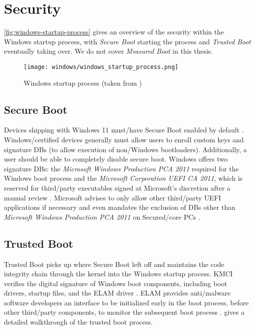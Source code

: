 
\section{Security}
\vspace{-0.5em}

\autoref{fig:windows-startup-process} gives an overview of the security within the Windows startup process, with \emph{Secure Boot} starting the process and \emph{Trusted Boot} eventually taking over.
We do not cover \emph{Measured Boot} in this thesis.

\begin{figure}[phtb]
    \centering
    \texttt{[image: windows/windows\_startup\_process.png]}
    \caption[Windows startup process]{Windows startup process (taken from \cite{microsoft-secure-the-windows-boot-process})}
    \label{fig:windows-startup-process}
\end{figure}

\vspace{-0.5em}
\subsection{Secure Boot}
\vspace{-0.5em}
Devices shipping with Windows 11 must\-/have Secure Boot enabled by default \cite{microsoft-windows-minimum-hardware-requirements-overview}.
Windows\-/certified devices generally must allow users to enroll custom keys and signature \acp{DB} (to allow execution of non\-/Windows bootloaders).
Additionally, a user should be able to completely disable secure boot.
Windows offers two signature \acp{DB}: the \emph{Microsoft Windows Production PCA 2011} required for the Windows boot process and the \emph{Microsoft Corporation \ac{UEFI} \ac{CA} 2011}, which is reserved for third\-/party executables signed at Microsoft's discretion after a manual review \cite{microsoft-uefi-signing}.
Microsoft advises to only allow other third\-/party \ac{UEFI} applications if necessary and even mandates the exclusion of \acp{DB} other than \emph{Microsoft Windows Production PCA 2011} on Secured\-/core \acsp{PC}  \cite{microsoft-secure-the-windows-boot-process}.

\subsection{Trusted Boot}
\vspace{-0.5em}
Trusted Boot picks up where Secure Boot left off and maintains the code integrity chain through the kernel into the Windows startup process.
\ac{KMCI} verifies the digital signature of Windows boot components, including boot drivers, startup files, and the \ac{ELAM} driver \cite{microsoft-trusted-boot}.
\ac{ELAM} provides anti\-/malware software developers an interface to be initialized early in the boot process, before other third\-/party components, to monitor the subsequent boot process \cite{micosoft-windows-elam}.
\cite{understanding-windows-trusted-boot} gives a detailed walkthrough of the trusted boot process.

